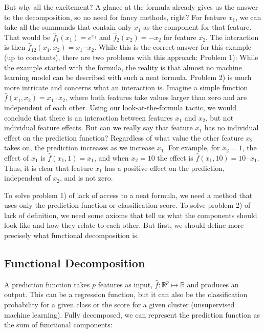 \documentclass[
  11pt,
]{scrbook}
\begin{document}
But why all the excitement?
A glance at the formula already gives us the answer to the decomposition, so no need for fancy methods, right?
For feature \(x_1\), we can take all the summands that contain only \(x_1\) as the component for that feature.
That would be \(\hat{f}_1(x_1) = e^{x_1}\) and \(\hat{f}_2(x_2) = -x_2\) for feature \(x_2\).
The interaction is then \(\hat{f}_{12}(x_{1},x_{2}) = x_1 \cdot x_2\).
While this is the correct answer for this example (up to constants), there are two problems with this approach:
Problem 1): While the example started with the formula, the reality is that almost no machine learning model can be described with such a neat formula.
Problem 2) is much more intricate and concerns what an interaction is.
Imagine a simple function \(\hat{f}(x_1,x_2) = x_1 \cdot x_2\), where both features take values larger than zero and are independent of each other.
Using our look-at-the-formula tactic, we would conclude that there is an interaction between features \(x_1\) and \(x_2\), but not individual feature effects.
But can we really say that feature \(x_1\) has no individual effect on the prediction function?
Regardless of what value the other feature \(x_2\) takes on, the prediction increases as we increase \(x_1\).
For example, for \(x_2 = 1\), the effect of \(x_1\) is \(\hat{f}(x_1, 1) = x_1\), and when \(x_2 = 10\) the effect is \(\hat{f}(x_1, 10) = 10 \cdot x_1\).
Thus, it is clear that feature \(x_1\) has a positive effect on the prediction, independent of \(x_2\), and is not zero.

To solve problem 1) of lack of access to a neat formula, we need a method that uses only the prediction function or classification score.
To solve problem 2) of lack of definition, we need some axioms that tell us what the components should look like and how they relate to each other.
But first, we should define more precisely what functional decomposition is.

\hypertarget{functional-decomposition}{%
\subsection{Functional Decomposition}\label{functional-decomposition}}

A prediction function takes \(p\) features as input, \(\hat{f}: \mathbb{R}^p \mapsto \mathbb{R}\) and produces an output.
This can be a regression function, but it can also be the classification probability for a given class or the score for a given cluster (unsupervised machine learning).
Fully decomposed, we can represent the prediction function as the sum of functional components:
\end{document}
